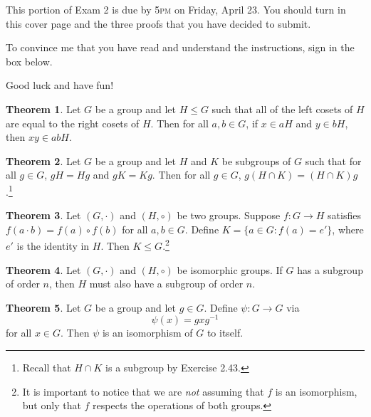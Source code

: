 \documentclass[11pt]{article}
\theoremstyle{definition}
\newtheorem{theorem}{Theorem}
\begin{document}
This portion of Exam 2 is due by 5\textsc{pm} on Friday, April 23.  You should turn in this cover page and the three proofs that you have decided to submit.

\bigskip

To convince me that you have read and understand the instructions, sign in the box below.

\bigskip


\bigskip

Good luck and have fun!

\newpage

\begin{theorem}
Let $G$ be a group and let $H\leq G$ such that all of the left cosets of $H$ are equal to the right cosets of $H$.  Then for all $a,b\in G$, if $x\in aH$ and $y\in bH$, then $xy\in abH$.
\end{theorem}

\newpage

\begin{theorem}
Let $G$ be a group and let $H$ and $K$ be subgroups of $G$ such that for all $g\in G$, $gH=Hg$ and $gK=Kg$.  Then for all $g\in G$, $g(H\cap K)=(H\cap K)g$.\footnote{Recall that $H\cap K$ is a subgroup by Exercise 2.43.}
\end{theorem}

\newpage

\begin{theorem}
Let $(G,\cdot)$ and $(H,\circ)$ be two groups.  Suppose $f:G\to H$ satisfies $f(a\cdot b)=f(a)\circ f(b)$ for all $a,b\in G$.  Define $K=\{a\in G:f(a)=e'\}$, where $e'$ is the identity in $H$.  Then $K\leq G$.\footnote{It is important to notice that we are \emph{not} assuming that $f$ is an isomorphism, but only that $f$ respects the operations of both groups.}
\end{theorem}

\newpage

\begin{theorem}
Let $(G,\cdot)$ and $(H,\circ)$ be isomorphic groups.  If $G$ has a subgroup of order $n$, then $H$ must also have a subgroup of order $n$.
\newpage
\end{theorem}

\newpage

\begin{theorem}
Let $G$ be a group and let $g\in G$.  Define $\psi: G\to G$ via
\[
\psi(x)=gxg^{-1}
\]
for all $x\in G$.  Then $\psi$ is an isomorphism of $G$ to itself.
\end{theorem}
\end{document}
